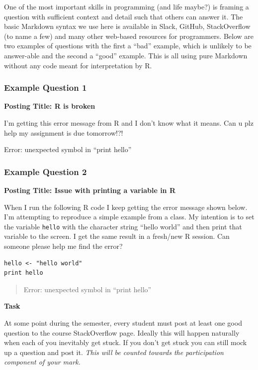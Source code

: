 \documentclass[
]{article}
\begin{document}
One of the most important skills in programming (and life maybe?) is
framing a question with sufficient context and detail such that others
can answer it. The basic Markdown syntax we use here is available in
Slack, GitHub, StackOverflow (to name a few) and many other web-based
resources for programmers. Below are two examples of questions with the
first a ``bad'' example, which is unlikely to be answer-able and the
second a ``good'' example. This is all using pure Markdown without any
code meant for interpretation by R.

\hypertarget{example-question-1}{%
\subsubsection{Example Question 1}\label{example-question-1}}

\textbf{Posting Title: R is broken}

I'm getting this error message from R and I don't know what it means.
Can u plz help my assignment is due tomorrow!?!

Error: unexpected symbol in ``print hello''

\hypertarget{example-question-2}{%
\subsubsection{Example Question 2}\label{example-question-2}}

\textbf{Posting Title: Issue with printing a variable in R}

When I run the following R code I keep getting the error message shown
below. I'm attempting to reproduce a simple example from a class. My
intention is to set the variable \texttt{hello} with the character
string ``hello world'' and then print that variable to the screen. I get
the same result in a fresh/new R session. Can someone please help me
find the error?

\begin{verbatim}
hello <- "hello world"
print hello
\end{verbatim}

\begin{quote}
Error: unexpected symbol in ``print hello''
\end{quote}

\textbf{Task}

At some point during the semester, every student must post at least one
good question to the course StackOverflow page. Ideally this will happen
naturally when each of you inevitably get stuck. If you don't get stuck
you can still mock up a question and post it. \emph{This will be counted
towards the participation component of your mark.}
\end{document}
